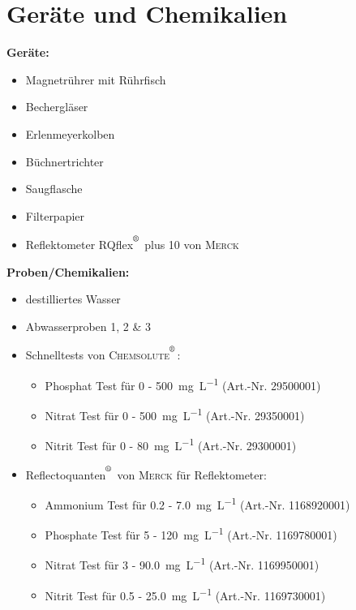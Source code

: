 \chapter{Geräte und Chemikalien}
\label{sec:geraete}

\textbf{Geräte:}
\begin{itemize}
	\item Magnetrührer mit Rührfisch
	\item Bechergläser
	\item Erlenmeyerkolben
	\item Büchnertrichter
	\item Saugflasche
	\item Filterpapier
	\item Reflektometer RQflex$^{\textsuperscript{\textregistered}}$ plus 10 von \textsc{Merck}
\end{itemize}

\vspace*{5mm}

\textbf{Proben/Chemikalien:}
\begin{itemize}
	\item destilliertes Wasser
	\item Abwasserproben 1, 2 \& 3
		\item Schnelltests von \textsc{Chemsolute$^{\textsuperscript{\textregistered}}$}:
	\begin{itemize}
		\item Phosphat Test für \SI{0}{} - \SI{500}{\milli \gram \per \liter}  (Art.-Nr. 29500001) 
		\item Nitrat Test für \SI{0}{} - \SI{500}{\milli \gram \per \liter}  (Art.-Nr. 29350001) 
		\item Nitrit Test für \SI{0}{} - \SI{80}{\milli \gram \per \liter}  (Art.-Nr. 29300001) 
	\end{itemize}
	\item Reflectoquanten$^{\textsuperscript{\textregistered}}$ von \textsc{Merck} für Reflektometer:
	\begin{itemize}
		\item Ammonium Test für \SI{0.2}{} - \SI{7.0}{\milli \gram \per \liter}  (Art.-Nr. 1168920001) 
		\item Phosphate Test für \SI{5}{} - \SI{120}{\milli \gram \per \liter}  (Art.-Nr. 1169780001) 
		\item Nitrat Test für \SI{3}{} - \SI{90.0}{\milli \gram \per \liter}  (Art.-Nr. 1169950001) 
		\item Nitrit Test für \SI{0.5}{} - \SI{25.0}{\milli \gram \per \liter}  (Art.-Nr. 1169730001) 
	\end{itemize}
\end{itemize}





